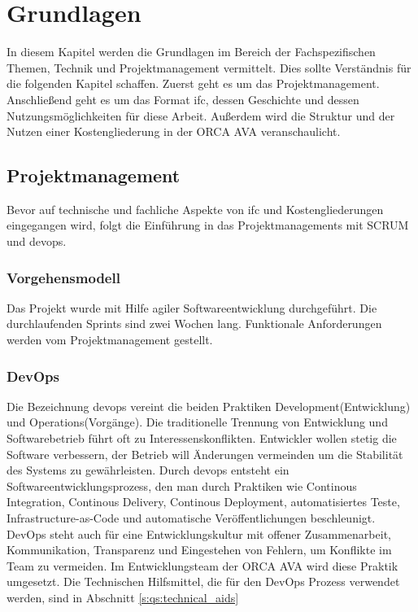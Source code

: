 \newpage
\section{Grundlagen}
\label{s:basics}
In diesem Kapitel werden die Grundlagen im Bereich der Fachspezifischen Themen, Technik und Projektmanagement vermittelt. Dies sollte Verständnis für die folgenden Kapitel schaffen. Zuerst geht es um das Projektmanagement. Anschließend geht es um das Format \ac{ifc}, dessen Geschichte und dessen Nutzungsmöglichkeiten für diese Arbeit. Außerdem wird die Struktur und der Nutzen einer Kostengliederung in der ORCA AVA veranschaulicht.

\subsection{Projektmanagement}
\label{s:basics:project-management}
Bevor auf technische und fachliche Aspekte von \ac{ifc} und Kostengliederungen eingegangen wird, folgt die Einführung in das Projektmanagements mit SCRUM und \ac{devops}.

\subsubsection{Vorgehensmodell}
\label{s:basics:project-management:procedure_model}
Das Projekt wurde mit Hilfe agiler Softwareentwicklung durchgeführt. Die durchlaufenden Sprints sind zwei Wochen lang. Funktionale Anforderungen werden vom Projektmanagement gestellt.

\subsubsection{DevOps}
\label{s:basics:project-management:devops}
Die Bezeichnung \ac{devops} vereint die beiden Praktiken \glqq Development\grqq{}(Entwicklung) und \glqq Operations\grqq{}(Vorgänge). Die traditionelle Trennung von Entwicklung und Softwarebetrieb führt oft zu
Interessenskonflikten. Entwickler wollen stetig die Software verbessern, der Betrieb will Änderungen vermeinden um die Stabilität des Systems zu gewährleisten. Durch \ac{devops} entsteht ein Softwareentwicklungsprozess, den man durch Praktiken wie Continous Integration, Continous Delivery, Continous Deployment, automatisiertes Teste, Infrastructure-as-Code und automatische Veröffentlichungen beschleunigt. DevOps steht auch für eine Entwicklungskultur mit offener Zusammenarbeit, Kommunikation, Transparenz und Eingestehen von Fehlern, um Konflikte im Team zu vermeiden. Im Entwicklungsteam der ORCA AVA wird diese Praktik umgesetzt.
Die Technischen Hilfsmittel, die für den DevOps Prozess verwendet werden, sind in Abschnitt \ref{s:qs:technical_aids} \citep{devops_2021}

